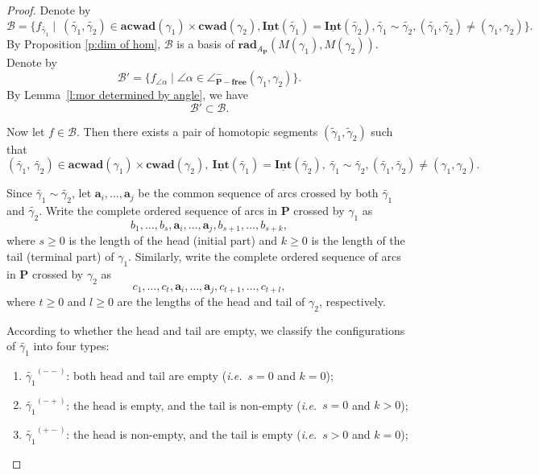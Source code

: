 \documentclass[a4paper,10pt]{amsart}
\theoremstyle{plain}          %
\theoremstyle{definition}
\def\ba{\mathbf{a}}
\def\PP{\mathbf{P}}
\newcommand{\Intv}{\underline{\mathbf{Int}}}
\newcommand{\apfree}{\angle^-_{\mathbf{P-free}}}
\newcommand{\aad}{\mathbf{acwad}}
\newcommand{\cad}{\mathbf{cwad}}
\newcommand{\ie}{{\em i.e.}\ }
\begin{document}
\begin{proof}
Denote by
 $$\mathcal{B}=\{f_{\widetilde{\gamma_1}}\mid~(\widetilde{\gamma_1},\widetilde{\gamma_2})\in\aad(\gamma_1)\times\cad(\gamma_2), \Intv(\widetilde{\gamma_1})=\Intv(\widetilde{\gamma_2}),\widetilde{\gamma_1}\sim\widetilde{\gamma_2}, (\widetilde{\gamma_1},\widetilde{\gamma_2})\neq {(\gamma_1,\gamma_2)}\}.$$
By Proposition \ref{p:dim of hom}, $\mathcal{B}$ is a basis of $\mathbf{rad}_{A_\PP}(M(\gamma_1),M(\gamma_2))$.
Denote by $$\mathcal{B}'=\{f_{\angle\alpha}\mid\angle\alpha\in \apfree(\gamma_1,\gamma_2)\}.$$ 
By Lemma~\ref{l:mor determined by angle}, we have $$\mathcal{B}'\subset\mathcal{B}.$$

Now let $f\in \mathcal{B}$. Then there exists a pair of homotopic segments $(\widetilde{\gamma}_1, \widetilde{\gamma}_2)$ such that 
 \[(\widetilde{\gamma_{1}},~\widetilde{\gamma_{2}})\in\aad(\gamma_1)\times\cad(\gamma_2), ~\Intv(\widetilde{\gamma_{1}})=\Intv(\widetilde{\gamma_{2}}), ~\widetilde{\gamma_{1}}\sim\widetilde{\gamma_{2}}, (\widetilde{\gamma_1},\widetilde{\gamma_2})\neq {(\gamma_1,\gamma_2)}.\]

Since $\widetilde{\gamma_{1}}\sim \widetilde{\gamma_{2}}$, let $\ba_i, \dots, \ba_j$ be the common sequence of arcs crossed by both $\widetilde{\gamma_{1}}$ and $\widetilde{\gamma_{2}}$. Write the complete ordered sequence of arcs in $\PP$ crossed by $\gamma_1$ as $$b_1, \dots, b_s, \ba_i, \dots, \ba_j, b_{s+1}, \dots, b_{s+k},$$ where $s \ge 0$ is the length of the head (initial part) and $k \ge 0$ is the length of the tail (terminal part) of $\gamma_1$. Similarly, write the complete ordered sequence of arcs in $\PP$ crossed by $\gamma_2$ as $$c_1, \dots, c_t, \ba_i, \dots, \ba_j, c_{t+1}, \dots, c_{t+l},$$ where $t \ge 0$ and $l \ge 0$ are the lengths of the head and tail of $\gamma_2$, respectively.

According to whether the head and tail are empty, we classify the configurations of $\widetilde{\gamma_{1}}$ into four types:
\begin{enumerate}
   \item $\widetilde{\gamma_{1}}^{(--)}$: both head and tail are empty (\ie $s = 0$ and $k = 0$);
     \item $\widetilde{\gamma_{1}}^{(-+)}$: the head is empty, and the tail is non-empty (\ie $s = 0$ and $k > 0$);
    \item $\widetilde{\gamma_{1}}^{(+-)}$: the head is non-empty, and the tail is empty (\ie $s > 0$ and $k = 0$);
   

\end{enumerate}
\end{proof}
\end{document}
